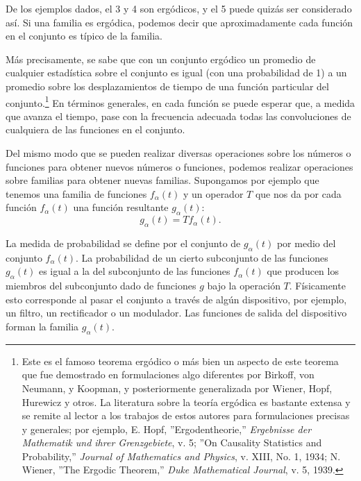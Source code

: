 De los ejemplos dados, el 3 y 4 son erg\'odicos, y el 5 puede quiz\'as
ser considerado as\'i. Si una familia es erg\'odica, podemos decir que
aproximadamente cada funci\'on en el conjunto es t\'ipico de la
familia.

M\'as precisamente, se sabe que con un conjunto erg\'odico un promedio
de cualquier estad\'istica sobre el conjunto es igual (con una
probabilidad de 1) a un promedio sobre los desplazamientos de tiempo
de una funci\'on particular del conjunto.\footnote[3]{Este es el
famoso teorema erg\'odico o m\'as bien un aspecto de este teorema que
fue demostrado en formulaciones algo diferentes por Birkoff, von
Neumann, y Koopman, y posteriormente generalizada por Wiener, Hopf,
Hurewicz y otros. La literatura sobre la teor\'ia erg\'odica es
bastante extensa y se remite al lector a los trabajos de estos autores
para formulaciones precisas y generales; por ejemplo, E. Hopf,
''Ergodentheorie,'' {\em Ergebnisse der Mathematik und ihrer
Grenzgebiete}, v. 5; ''On Causality Statistics and Probability,'' {\em
Journal of Mathematics and Physics}, v. XIII, No. 1, 1934; N. Wiener,
''The Ergodic Theorem,'' {\em Duke Mathematical Journal}, v. 5, 1939.}
En t\'erminos generales, en cada funci\'on se puede esperar que, a
medida que avanza el tiempo, pase con la frecuencia adecuada todas las
convoluciones de cualquiera de las funciones en el conjunto.


Del mismo modo que se pueden realizar diversas operaciones sobre los
n\'umeros o funciones para obtener nuevos n\'umeros o funciones,
podemos realizar operaciones sobre familias para obtener nuevas
familias. Supongamos por ejemplo que tenemos una familia de funciones
$f_{\alpha}(t)$ y un operador $T$ que nos da por cada funci\'on
$f_{\alpha}(t)$ una funci\'on resultante $g_{\alpha}(t)$:
\begin{equation}
  g_{\alpha}(t) = Tf_{\alpha}(t).
\end{equation}

La medida de probabilidad se define por el conjunto de $g_{\alpha}(t)$
por medio del conjunto $f_{\alpha}(t)$. La probabilidad de un cierto
subconjunto de las funciones $g_{\alpha}(t)$ es igual a la del
subconjunto de las funciones $f_{\alpha}(t)$ que producen los miembros
del subconjunto dado de funciones $g$ bajo la operaci\'on
$T$. F\'isicamente esto corresponde al pasar el conjunto a trav\'es de
alg\'un dispositivo, por ejemplo, un filtro, un rectificador o un
modulador. Las funciones de salida del dispositivo forman la familia
$g_{\alpha}(t)$.

